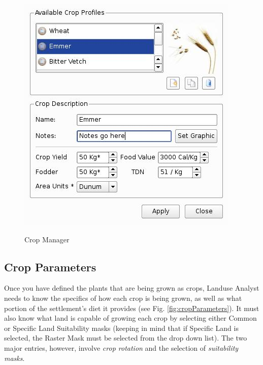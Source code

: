       \begin{figure}[htbp]
        \includegraphics[scale=.6]{./images/cropManager.jpg}
      \label{fig:cropManager} \caption{Crop Manager}
    \end{figure}


  \subsection{Crop Parameters}
  \label{cropParameters}
  Once you have defined the plants that are being grown as crops, Landuse
Analyst needs to know the specifics of how each crop is being grown, as well as
what portion of the settlement's diet it provides (see Fig.
\ref{fig:cropParameters}).  It must also
know what land is capable of growing each crop by selecting either Common or
Specific Land Suitability masks (keeping in mind that if Specific Land is
selected, the Raster Mask must be selected from the drop down list).  The two
major entries, however, involve \textit{crop rotation} and the selection of
\textit{suitability masks}.

